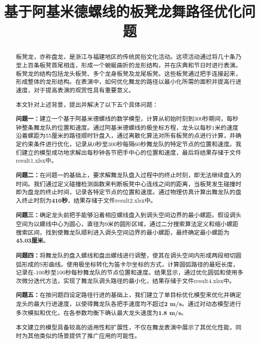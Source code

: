 \documentclass[withoutpreface, bwprint]{cumcmthesis} %
\title{基于阿基米德螺线的板凳龙舞路径优化问题}
\begin{document}
\maketitle

\begin{abstract}
    板凳龙，亦称盘龙，是浙江与福建地区的传统民俗文化活动。这项活动通过将几十条乃至上百条板凳首尾相连，形成一个蜿蜒曲折的龙形结构，并在庆典和节日时进行表演。板凳龙的结构包括龙头板凳、多个龙身板凳及龙尾板凳。这些板凳通过把手连接起来，形成整体的龙形结构。在表演中，如何优化舞龙的路径以最小化所需的面积并提高行进速度，对于提高表演的观赏性具有重要意义。

    本文针对上述背景，提出并解决了以下五个具体问题：
    
    \textbf{问题一：}建立一个基于阿基米德螺线的数学模型，计算从初始时刻到300秒期间，每秒钟整条舞龙队的位置和速度。通过阿基米德螺线的极坐标方程，龙头以每秒1米的速度沿着螺距为55厘米的路径顺时针盘入，通过离散化算法对所有板凳的点进行计算，并确定约束条件进行优化，记录从0秒至300秒每隔60秒舞龙队的特定节点的位置和速度。我们建立的模型成功地求解出每秒钟各节把手中心的位置和速度，最后将结果存储于文件result1.xlsx中。
    
    \textbf{问题二：}在问题一的基础上，要求解舞龙队盘入过程中的终止时刻，即无法继续盘入的时间。我们通过定义碰撞检测函数来判断板凳中心连线之间的距离，当板凳发生碰撞时即为盘龙的终止时间，记录各特定节点的位置和速度。通过物理仿真计算出舞龙队的盘入终止时刻为\textbf{410秒}，结果存储于文件result2.xlsx中。
    
    \textbf{问题三：}确定龙头前把手能够沿着相应螺线盘入到调头空间边界的最小螺距。假设调头空间为以螺线中心为圆心，直径为9米的圆形区域，通过二分搜索算法定义和缩小螺距搜索区间，找到使舞龙队顺利进入调头空间边界的最小螺距，最终确定最小螺距为\textbf{45.03厘米}。
    
    \textbf{问题四：}将舞龙队的盘入螺线和盘出螺线进行调整，使其在调头空间内形成两段相切圆弧形成的S形曲线。使用极坐标转化为笛卡尔坐标的方式，计算圆弧路径的最短长度，记录在-100秒至100秒每秒舞龙队的节点位置和速度。结果显示，通过优化圆弧和使用多次微分迭代方法，实现了舞龙队调头路径的最小化，结果存储于文件result4.xlsx中。
    
    \textbf{问题五：}在按问题四设定路径行进的基础上，我们建立了单目标优化模型来优化并确定龙头的最大行进速度，以使得舞龙队各把手速度均不超过\textbf{2 m/s}。通过对动态模型进行多次模拟和优化，在各参数均衡下确认最大龙头速度为\textbf{1.8 m/s}。
    
    本文建立的模型具备较高的适用性和扩展性，不仅在舞龙表演中展示了其优化性能，同时为其他类似的场景提供了推广应用的可能性。

\end{abstract}
\end{document}
